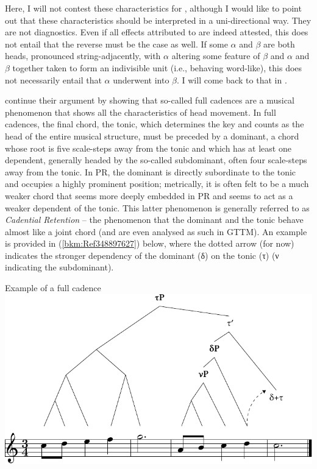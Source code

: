 \documentclass[output=paper]{langsci/langscibook}
\begin{document}
Here, I will not contest these characteristics for , although I would
like to point out that these characteristics should be interpreted in a
uni-directional way. They are not diagnostics. Even if all effects attributed
to  are indeed attested, this does not entail that the reverse
must be the case as well. If some ${\alpha}$ and ${\beta}$ are both heads,
pronounced string-adjacently, with ${\alpha}$ altering some feature of
${\beta}$ and ${\alpha}$ and ${\beta}$ together taken to form an indivisible
unit (i.e., behaving word-like), this does not necessarily entail that
${\alpha}$ underwent  into ${\beta}$. I will come back to that in
.

\citeauthor{KatzPes2011} continue their argument by showing that so-called full
cadences are a musical phenomenon that shows all the characteristics of head
movement. In full cadences, the final chord, the tonic, which determines the
key and counts as the head of the entire musical structure, must be preceded by
a dominant, a chord whose root is five scale-steps away from the tonic and
which has at least one dependent, generally headed by the so-called
subdominant, often four scale-steps away from the tonic. In \gls{PR}, the
dominant is directly subordinate to the tonic and occupies a highly prominent
position; metrically, it is often felt to be a much weaker chord that seems
more deeply embedded in \gls{PR} and seems to act as a weaker dependent of the
tonic. This latter phenomenon is generally referred to as \emph{Cadential
Retention} – the phenomenon that the dominant and the tonic behave almost like
a joint chord (and are even analysed as such in GTTM). An example is provided
in (\ref{bkm:Ref348897627}) below, where the dotted arrow (for now) indicates
the stronger dependency of the dominant (δ) on the tonic (τ) (ν indicating the
subdominant).

\ea\label{bkm:Ref348897627}Example of a full cadence \parencite[44]{KatzPes2011}
    \includegraphics[scale=.9]{./img/28-12.pdf}
\z
\end{document}
